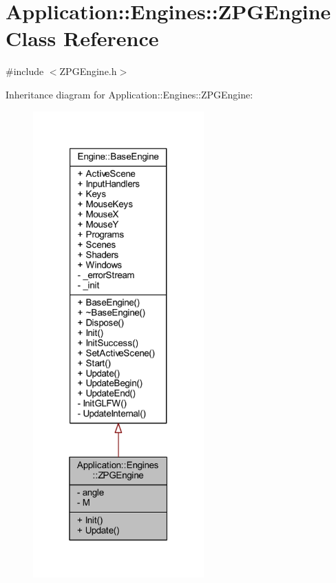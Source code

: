 \hypertarget{classApplication_1_1Engines_1_1ZPGEngine}{}\section{Application\+:\+:Engines\+:\+:Z\+P\+G\+Engine Class Reference}
\label{classApplication_1_1Engines_1_1ZPGEngine}


{\ttfamily \#include $<$Z\+P\+G\+Engine.\+h$>$}



Inheritance diagram for Application\+:\+:Engines\+:\+:Z\+P\+G\+Engine\+:
\nopagebreak
\begin{figure}[H]
\begin{center}
\leavevmode
\includegraphics[width=186pt]{classApplication_1_1Engines_1_1ZPGEngine__inherit__graph}
\end{center}
\end{figure}


